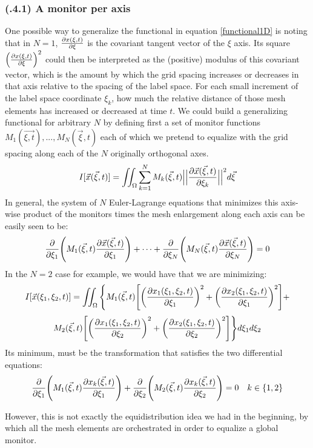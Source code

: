\documentclass[11pt, a4paper]{article} %
\begin{document}
\subsubsection*{\bf (\textgamma.4.1) A monitor per axis}
One possible way to generalize the functional in equation \eqref{functional1D} is noting that in $N=1$, $\pdv{x(\xi,t)}{\xi}$ is the covariant tangent vector of the $\xi$ axis. Its square $\qty(\pdv{x(\xi,t)}{\xi})^2$ could then be interpreted as the (positive) modulus of this covariant vector, which is the amount by which the grid spacing increases or decreases in that axis relative to the spacing of the label space. For each small increment of the label space coordinate $\xi_k$, how much the relative distance of those mesh elements has increased or decreased at time $t$. We could build a generalizing functional for arbitrary $N$ by defining first a set of monitor functions $M_1(\vec{\xi,t}),...,M_N(\vec{\xi},t)$ each of which we pretend to equalize with the grid spacing along each of the $N$ originally orthogonal axes.
\begin{equation}
I[\vec{x}(\vec{\xi},t)]=\iint_\Omega \sum_{k=1}^N M_k(\vec{\xi},t) \Big|\Big|\pdv{\vec{x}(\vec{\xi},t)}{\xi_k}\Big|\Big|^2 d\vec{\xi}
\end{equation}
In general, the system of $N$ Euler-Lagrange equations that minimizes this axis-wise product of the monitors times the mesh enlargement along each axis can be easily seen to be:
\begin{equation}
\pdv{}{\xi_1} \qty( M_1(\vec{\xi},t)\pdv{\vec{x}(\vec{\xi},t)}{\xi_1} )+\cdots+\pdv{}{\xi_N}\qty( M_N(\vec{\xi},t)\pdv{\vec{x}(\vec{\xi},t)}{\xi_N} )=0
\end{equation}
In the $N=2$ case for example, we would have that we are minimizing:
\begin{equation}
I[\vec{x}(\xi_1, \xi_2,t)]=\iint_\Omega \Bigg\{M_1(\vec{\xi},t) \qty[\qty(\pdv{x_1(\xi_1,\xi_2,t)}{\xi_1})^2+\qty(\pdv{x_2(\xi_1,\xi_2,t)}{\xi_1})^2] +
\end{equation}
$$
M_2(\vec{\xi},t) \qty[\qty(\pdv{x_1(\xi_1,\xi_2,t)}{\xi_2})^2+\qty(\pdv{x_2(\xi_1,\xi_2,t)}{\xi_2})^2]\Bigg\} d\xi_1d\xi_2
$$
Its minimum, must be the transformation that satisfies the two differential equations:
\begin{equation}
\pdv{}{\xi_1} \qty( M_1(\vec{\xi},t)\pdv{x_k(\vec{\xi},t)}{\xi_1} )+\pdv{}{\xi_2}\qty( M_2(\vec{\xi},t)\pdv{x_k(\vec{\xi},t)}{\xi_2} )=0 \quad k\in\{1,2\}
\end{equation}

However, this is not exactly the equidistribution idea we had in the beginning, by which all the mesh elements are orchestrated in order to equalize a global monitor.
\end{document}
